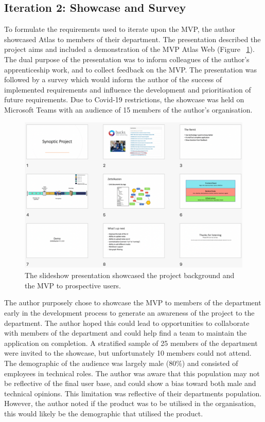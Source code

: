 \documentclass{article}
\begin{document}
\clearpage
\subsection{Iteration 2: Showcase and Survey}

To formulate the requirements used to iterate upon the MVP, the author showcased Atlas to members of their department. The presentation described the project aims and included a demonstration of the MVP Atlas Web (Figure ~\ref{fig:pres}). The dual purpose of the presentation was to inform colleagues of the author's apprenticeship work, and to collect feedback on the MVP. The presentation was followed by a survey which would inform the author of the success of implemented requirements and influence the development and prioritisation of future requirements. Due to Covid-19 restrictions, the showcase was held on Microsoft Teams with an audience of 15 members of the author’s organisation. 

\begin{figure}[!htb]
  \centering
      \includegraphics[width=1\textwidth]{images/showcase.png}
  \caption{The slideshow presentation showcased the project background and the MVP  to prospective users.}
  \label{fig:pres}
\end{figure}

The author purposely chose to showcase the MVP to members of the department early in the development process to generate an awareness of the project to the department. The author hoped this could lead to opportunities to collaborate with members of the department and could help find a team to maintain the application on completion. A stratified sample of 25 members of the department were invited to the showcase, but unfortunately 10 members could not attend. The demographic of the audience was largely male (80\%) and consisted of employees in technical roles. The author was aware that this population may not be reflective of the final user base, and could show a bias toward both male and technical opinions. This limitation was reflective of their departments population. However, the author noted if the product was to be utilised in the organisation, this would likely be the demographic that utilised the product.
\end{document}
